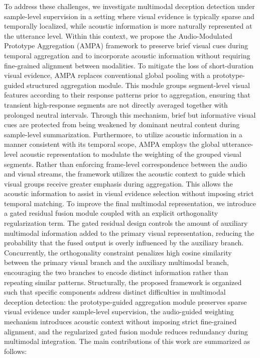 \documentclass[sigconf,screen,review,anonymous]{acmart}
\begin{document}
To address these challenges, we investigate multimodal deception detection under sample-level supervision in a setting where visual evidence is typically sparse and temporally localized, while acoustic information is more naturally represented at the utterance level. Within this context, we propose the Audio-Modulated Prototype Aggregation (AMPA) framework to preserve brief visual cues during temporal aggregation and to incorporate acoustic information without requiring fine-grained alignment between modalities. To mitigate the loss of short-duration visual evidence, AMPA replaces conventional global pooling with a prototype-guided structured aggregation module. This module groups segment-level visual features according to their response patterns prior to aggregation, ensuring that transient high-response segments are not directly averaged together with prolonged neutral intervals. Through this mechanism, brief but informative visual cues are protected from being weakened by dominant neutral content during sample-level summarization. Furthermore, to utilize acoustic information in a manner consistent with its temporal scope, AMPA employs the global utterance-level acoustic representation to modulate the weighting of the grouped visual segments. Rather than enforcing frame-level correspondence between the audio and visual streams, the framework utilizes the acoustic context to guide which visual groups receive greater emphasis during aggregation. This allows the acoustic information to assist in visual evidence selection without imposing strict temporal matching. To improve the final multimodal representation, we introduce a gated residual fusion module coupled with an explicit orthogonality regularization term. The gated residual design controls the amount of auxiliary multimodal information added to the primary visual representation, reducing the probability that the fused output is overly influenced by the auxiliary branch. Concurrently, the orthogonality constraint penalizes high cosine similarity between the primary visual branch and the auxiliary multimodal branch, encouraging the two branches to encode distinct information rather than repeating similar patterns. Structurally, the proposed framework is organized such that specific components address distinct difficulties in multimodal deception detection: the prototype-guided aggregation module preserves sparse visual evidence under sample-level supervision, the audio-guided weighting mechanism introduces acoustic context without imposing strict fine-grained alignment, and the regularized gated fusion module reduces redundancy during multimodal integration. 
The main contributions of this work are summarized as follows:
\end{document}
